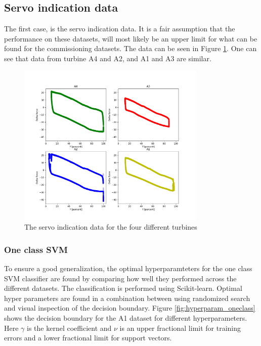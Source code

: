         
    \subsection{Servo indication data}
        The first case, is the servo indication data. It is a fair assumption that the performance on these datasets, will most likely be an upper limit for what can be found for the commissioning datasets. The data can be seen in Figure \ref{fig:servo_indication_analysis}. One can see that data from turbine A4 and A2, and A1 and A3 are similar. 
        
        \begin{figure}[]
            \centering
            \includegraphics[width=0.8\textwidth]{figures/data/servo_indication_all.png}
            \caption{The servo indication data for the four different turbines}
            \label{fig:servo_indication_analysis}
        \end{figure}
        
        \subsubsection{One class SVM}
            To ensure a good generalization, the optimal hyperparamteters for the one class SVM classifier are found by comparing how well they performed across the different datasets. The classification is performed using Scikit-learn. Optimal hyper parameters are found in a combination between using randomized search and visual inspection of the decision boundary. Figure \ref{fig:hyperparam_oneclass} shows the decision boundary for the A1 dataset for different hyperparameters. Here $\gamma$ is the kernel coefficient and $\nu$ is an upper fractional limit for training errors and a lower fractional limit for support vectors. 
            
